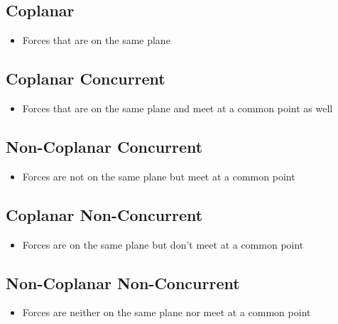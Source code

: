 \documentclass[8pt]{report}
\begin{document}
	\subsection{Coplanar}
		\begin{itemize}
			\item Forces that are on the same plane
		\end{itemize}
	\subsection{Coplanar Concurrent}
		\begin{itemize}
			\item Forces that are on the same plane and meet at a common point as well
		\end{itemize}
	\subsection{Non-Coplanar Concurrent}
		\begin{itemize}
			\item Forces are not on the same plane but meet at a common point
		\end{itemize}
	\subsection{Coplanar Non-Concurrent}
		\begin{itemize}
			\item Forces are on the same plane but don't meet at a common point
		\end{itemize}
	\subsection{Non-Coplanar Non-Concurrent}			
		\begin{itemize}
			\item Forces are neither on the same plane nor meet at a common point
		\end{itemize}\hrulefill
\end{document}
